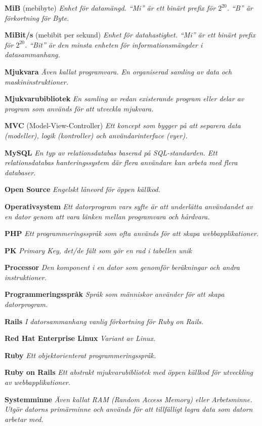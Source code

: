 \documentclass[a4paper, twoside, 11pt, titlepage]{article}
\begin{document}
	\textbf{MiB} (mebibyte) \emph{Enhet för datamängd. ``Mi'' är ett binärt prefix för $2^20$. ``B'' är förkortning för Byte.}

	\textbf{MiBit/s} (mebibit per sekund) \emph{Enhet för datahastighet. ``Mi'' är ett binärt prefix för $2^20$. ``Bit'' är den minsta enheten för informationsmängder i datasammanhang.}

	\textbf{Mjukvara} \emph{Även kallat programvara. En organiserad samling av data och maskininstruktioner.}

	\textbf{Mjukvarubibliotek} \emph{En samling av redan existerande program eller delar av program som används för att utveckla mjukvara.}

	\textbf{MVC} (Model-View-Controller) \emph{Ett koncept som bygger på att separera data (modeller), logik (kontroller) och användarinterface (vyer).}

	\textbf{MySQL} \emph{En typ av relationsdatabas baserad på SQL-standarden. Ett relationsdatabas hanteringssystem där flera användare kan arbeta med flera databaser.}

	\textbf{Open Source} \emph{Engelskt låneord för öppen källkod.}

	\textbf{Operativsystem} \emph{Ett datorprogram vars syfte är att underlätta användandet av en dator genom att vara länken mellan programvara och hårdvara.}

	\textbf{PHP} \emph{Ett programmeringsspråk som ofta används för att skapa webbapplikationer.}

	\textbf{PK} \emph{Primary Key, det/de fält som gör en rad i tabellen unik}

	\textbf{Processor} \emph{Den komponent i en dator som genomför beräkningar och andra instruktioner.}

	\textbf{Programmeringsspråk} \emph{Språk som människor använder för att skapa datorprogram.}

	\textbf{Rails} \emph{I datorsammanhang vanlig förkortning för Ruby on Rails.}

	\textbf{Red Hat Enterprise Linux} \emph{Variant av Linux.}

	\textbf{Ruby} \emph{Ett objektorienterat programmeringsspråk.}

	\textbf{Ruby on Rails} \emph{Ett abstrakt mjukvarubibliotek med öppen källkod för utveckling av webbapplikationer.}

	\textbf{Systemminne} \emph{Även kallat RAM (Random Access Memory) eller Arbetsminne. Utgör datorns primärminne och används för att tillfälligt lagra data som datorn arbetar med.}
\end{document}
